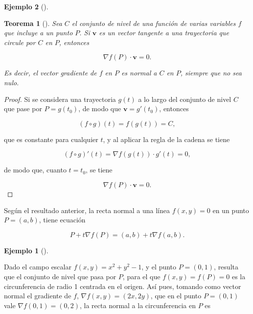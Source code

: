 \documentclass[
  a4paper,
]{scrreport}
\theoremstyle{definition}
\newtheorem{example}{Ejemplo}[chapter]
\theoremstyle{plain}
\theoremstyle{definition}
\theoremstyle{definition}
\theoremstyle{plain}
\newtheorem{theorem}{Teorema}[chapter]
\theoremstyle{plain}
\theoremstyle{remark}
\begin{document}
\begin{example}[]
\begin{theorem}[]
Sea \(C\) el conjunto de nivel de una función de varias variables \(f\)
que incluye a un punto \(P\). Si \(\mathbf{v}\) es un vector tangente a
una trayectoria que circule por \(C\) en \(P\), entonces

\[
\nabla f(P) \cdot \mathbf{v} = 0.
\]

Es decir, el vector gradiente de \(f\) en \(P\) es normal a \(C\) en
\(P\), siempre que no sea nulo.

\end{theorem}

\begin{tcolorbox}[enhanced jigsaw, leftrule=.75mm, colbacktitle=quarto-callout-note-color!10!white, toprule=.15mm, opacityback=0, opacitybacktitle=0.6, toptitle=1mm, breakable, bottomtitle=1mm, colframe=quarto-callout-note-color-frame, rightrule=.15mm, titlerule=0mm, title=\textcolor{quarto-callout-note-color}{\faInfo}\hspace{0.5em}{Demostración}, arc=.35mm, left=2mm, bottomrule=.15mm, colback=white, coltitle=black]

\begin{proof}
Si se considera una trayectoria \(g(t)\) a lo largo del conjunto de
nivel \(C\) que pase por \(P=g(t_0)\), de modo que
\(\mathbf{v}=g'(t_0)\), entonces

\[
(f\circ g)(t) = f(g(t)) = C,
\]

que es constante para cualquier \(t\), y al aplicar la regla de la
cadena se tiene

\[
(f\circ g)'(t) = \nabla f(g(t))\cdot  g'(t) = 0,
\]

de modo que, cuanto \(t=t_0\), se tiene

\[
\nabla f(P)\cdot \mathbf{v} = 0.
\]
\end{proof}

\end{tcolorbox}

Según el resultado anterior, la recta normal a una línea \(f(x,y)=0\) en
un punto \(P=(a,b)\), tiene ecuación

\[
P+t\nabla f(P) = (a, b) + t \nabla f(a,b).
\]

\begin{example}[]\protect\hypertarget{exm-tangente-normal-funcion-implicita-plano}{}\label{exm-tangente-normal-funcion-implicita-plano}

Dado el campo escalar \(f(x,y)=x^2+y^2-1\), y el punto \(P=(0,1)\),
resulta que el conjunto de nivel que pasa por \(P\), para el que
\(f(x,y)=f(P)=0\) es la circunferencia de radio 1 centrada en el origen.
Así pues, tomando como vector normal el gradiente de \(f\),
\(\nabla f(x,y) = (2x,2y)\), que en el punto \(P=(0,1)\) vale
\(\nabla f(0,1) = (0,2)\), la recta normal a la circunferencia en \(P\)
es


\end{example}
\end{example}
\end{document}
